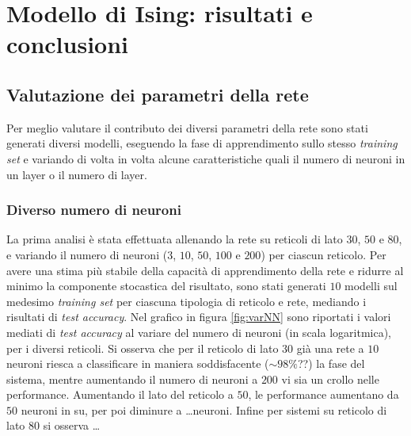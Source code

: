 \documentclass{article}
\begin{document}

\section{Modello di Ising: risultati e conclusioni}

\subsection{Valutazione dei parametri della rete}
Per meglio valutare il contributo dei diversi parametri della rete sono stati generati diversi modelli, eseguendo la fase di apprendimento sullo stesso \emph{training set} e variando di volta in volta alcune caratteristiche quali il numero di neuroni in un layer o il numero di layer.

\subsubsection{Diverso numero di neuroni}
La prima analisi è stata effettuata allenando la rete su reticoli di lato $30$, $50$ e $80$, e variando il numero di neuroni ($3$, $10$, $50$, $100$ e $200$) per ciascun reticolo. Per avere una stima più stabile della capacità di apprendimento della rete e ridurre al minimo la componente stocastica del risultato, sono stati generati $10$ modelli sul medesimo \emph{training set} per ciascuna tipologia di reticolo e rete, mediando i risultati di \emph{test accuracy}.
Nel grafico in figura \ref{fig:varNN} sono riportati i valori mediati di \emph{test accuracy} al variare del numero di neuroni (in scala logaritmica), per i diversi reticoli.
Si osserva che per il reticolo di lato $30$ già una rete a $10$ neuroni riesca a classificare in maniera soddisfacente ($\sim 98\%$??) la fase del sistema, mentre aumentando il numero di neuroni a $200$ vi sia un crollo nelle performance.
Aumentando il lato del reticolo a $50$, le performance aumentano da $50$ neuroni in su, per poi diminure a \dots neuroni.
Infine per sistemi su reticolo di lato $80$ si osserva \dots
\end{document}
